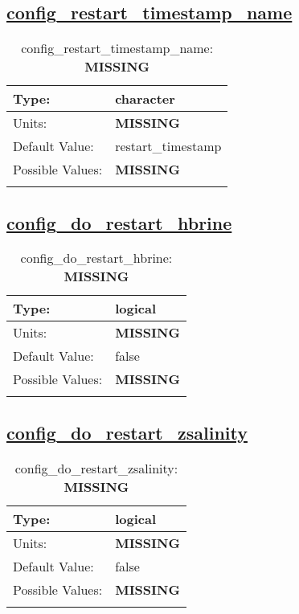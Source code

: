 \subsection[config\_restart\_timestamp\_name]{\hyperref[sec:nm_tab_restart]{config\_restart\_timestamp\_name}}
\label{subsec:nm_sec_config_restart_timestamp_name}
\begin{center}
\begin{longtable}{| p{2.0in} || p{4.0in} |}
    \hline
    Type: & character \\
    \hline
    Units: & {\bf \color{red} MISSING} \\
    \hline
    Default Value: & restart\_timestamp \\
    \hline
    Possible Values: & {\bf \color{red} MISSING} \\
    \hline
    \caption{config\_restart\_timestamp\_name: {\bf \color{red} MISSING}}
\end{longtable}
\end{center}
\subsection[config\_do\_restart\_hbrine]{\hyperref[sec:nm_tab_restart]{config\_do\_restart\_hbrine}}
\label{subsec:nm_sec_config_do_restart_hbrine}
\begin{center}
\begin{longtable}{| p{2.0in} || p{4.0in} |}
    \hline
    Type: & logical \\
    \hline
    Units: & {\bf \color{red} MISSING} \\
    \hline
    Default Value: & false \\
    \hline
    Possible Values: & {\bf \color{red} MISSING} \\
    \hline
    \caption{config\_do\_restart\_hbrine: {\bf \color{red} MISSING}}
\end{longtable}
\end{center}
\subsection[config\_do\_restart\_zsalinity]{\hyperref[sec:nm_tab_restart]{config\_do\_restart\_zsalinity}}
\label{subsec:nm_sec_config_do_restart_zsalinity}
\begin{center}
\begin{longtable}{| p{2.0in} || p{4.0in} |}
    \hline
    Type: & logical \\
    \hline
    Units: & {\bf \color{red} MISSING} \\
    \hline
    Default Value: & false \\
    \hline
    Possible Values: & {\bf \color{red} MISSING} \\
    \hline
    \caption{config\_do\_restart\_zsalinity: {\bf \color{red} MISSING}}
\end{longtable}
\end{center}
